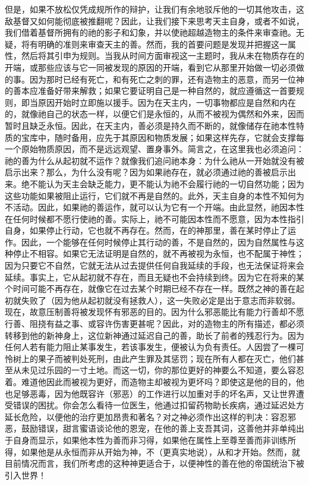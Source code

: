但是，如果不放松仅凭成规所作的辩护，让我们有余地驳斥他的一切其他攻击，这敌基督又如何能彻底被推翻呢？因此，让我们接下来思考天主自身，或者不如说，我们借着基督所拥有的祂的影子和幻象，并以使祂超越造物主的条件来审查祂。无疑，将有明确的准则来审查天主的善。然而，我的首要问题是发现并把握这一属性，然后将其引申为规则。当我从时间方面审视这一主题时，我从未在物质存在的开端，或那些应该与它一同被发现的原因的开端，看到它从那里开始做一切必须做的事。因为那时已经有死亡，和有死亡之刺的罪，还有造物主的恶意，而另一位神的善本应准备好带来解救；如果它要证明自己是一种自然的，就应遵循这一首要规则，即当原因开始时立即施以援手。因为在天主内，一切事物都应是自然和内在的，就像祂自己的状态一样，以便它们是永恒的，从而不被视为偶然和外来，因而暂时且缺乏永恒。因此，在天主内，善必须是持久而不断的，就像储存在祂本性特质的宝库中，随时备用，应先于其原因和物质发展；如果这样先存，它就会支撑每一个原始物质原因，而不是远远观望、置身事外。简言之，在这里我也必须追问：祂的善为什么从起初就不运作？就像我们追问祂本身：为什么祂从一开始就没有被启示出来？那么，为什么没有呢？因为如果祂存在，就必须通过祂的善被启示出来。绝不能认为天主会缺乏能力，更不能认为祂不会履行祂的一切自然功能；因为这些功能如果被阻止运行，它们就不再是自然的。此外，天主自身的本性不知何为不活动。因此，如果祂的善运作，就可以认为它有一个开端。由此显然，祂因本性在任何时候都不愿行使祂的善。实际上，祂不可能因本性而不愿意，因为本性指引自身，如果停止行动，它也就不再存在。然而，在的神那里，善在某时停止了运作。因此，一个能够在任何时候停止其行动的善，不是自然的，因为自然属性与这种停止不相容。如果它无法证明是自然的，就不再被视为永恒，也不配属于神性；因为只要它不自然，它就无法从过去提供任何自我延续的手段，也无法保证将来会延续。事实上，它从起初就不存在，而且无疑也不会持续到终。因为它在将来的某个时间可能不再存在，就像它在过去某个时期已经不存在一样。既然之神的善在起初就失败了（因为他从起初就没有拯救人），这一失败必定是出于意志而非软弱。现在，故意压制善将被发现怀有邪恶的目的。因为什么邪恶能比有能力行善却不愿行善、阻挠有益之事、或容许伤害更甚呢？因此，对的造物主的所有描述，都必须转移到他的新神身上，这位新神通过延迟自己的善，助长了前者的残忍行为。因为任何人若有能力阻止某事发生，若该事发生，便被认为负有责任。人因尝了一棵可怜树上的果子而被判处死刑，由此产生罪及其惩罚；现在所有人都在灭亡，他们甚至从未见过乐园的一寸土地。而这一切，你的那位更好的神要么不知道，要么容忍着。难道他因此而被视为更好，而造物主却被视为更坏吗？即使这是他的目的，他也足够恶毒，因为他既容许（邪恶）的工作进行以加重对手的坏名声，又让世界遭受错误的困扰。你会怎么看待一位医生，他通过扣留药物助长疾病，通过延迟处方延长危险，以便他的治疗更加昂贵和著名？对之神必须作出这样的判决：容忍邪恶，鼓励错误，甜言蜜语谈论他的恩宠，在他的善上支吾其词，这善他并非单纯出于自身而显示，如果他本性为善而非习得，如果他在属性上至尊至善而非训练所得，如果他是从永恒而非从开始为神，不（更真实地说），从和才开始。然而，就目前情况而言，我们所考虑的这种神更适合于，以便神性的善在他的帝国统治下被引入世界！\par

